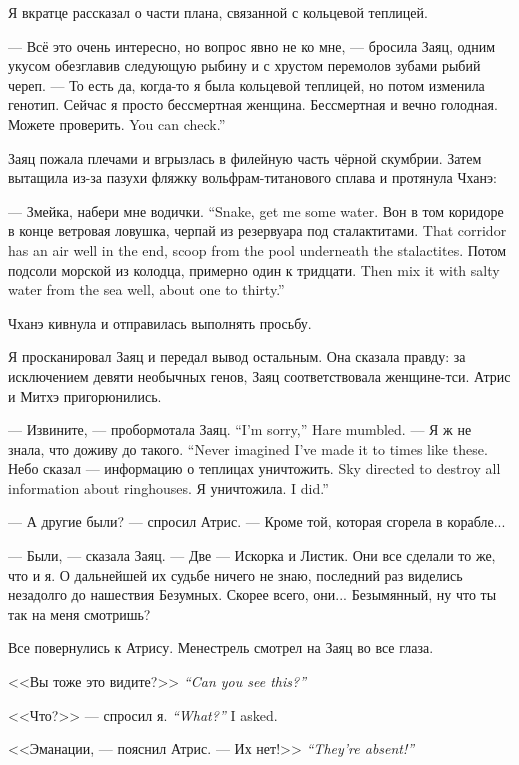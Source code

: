 Я вкратце рассказал о части плана, связанной с кольцевой теплицей.

--- Всё это очень интересно, но вопрос явно не ко мне, --- бросила Заяц, одним укусом обезглавив следующую рыбину и с хрустом перемолов зубами рыбий череп.
--- То есть да, когда-то я была кольцевой теплицей, но потом изменила генотип.
Сейчас я просто бессмертная женщина.
Бессмертная и вечно голодная.
{Можете проверить.}
{You can check.''}

Заяц пожала плечами и вгрызлась в филейную часть чёрной скумбрии.
Затем вытащила из-за пазухи фляжку вольфрам-титанового сплава и протянула Чханэ:

{--- Змейка, набери мне водички.}
{``Snake, get me some water.}
{Вон в том коридоре в конце ветровая ловушка, черпай из резервуара под сталактитами.}
{That corridor has an air well in the end, scoop from the pool underneath the stalactites.}
{Потом подсоли морской из колодца, примерно один к тридцати.}
{Then mix it with salty water from the sea well, about one to thirty.''}

Чханэ кивнула и отправилась выполнять просьбу.

Я просканировал Заяц и передал вывод остальным.
Она сказала правду: за исключением девяти необычных генов, Заяц соответствовала женщине-тси.
Атрис и Митхэ пригорюнились.

{--- Извините, --- пробормотала Заяц.}
{``I'm sorry,'' Hare mumbled.}
{--- Я ж не знала, что доживу до такого.}
{``Never imagined I've made it to times like these.}
{Небо сказал --- информацию о теплицах уничтожить.}
{Sky directed to destroy all information about ringhouses.}
{Я уничтожила.}
{I did.''}

--- А другие были? --- спросил Атрис.
--- Кроме той, которая сгорела в корабле...

--- Были, --- сказала Заяц.
--- Две --- Искорка и Листик.
Они все сделали то же, что и я.
О дальнейшей их судьбе ничего не знаю, последний раз виделись незадолго до нашествия Безумных.
Скорее всего, они...
Безымянный, ну что ты так на меня смотришь?

Все повернулись к Атрису.
Менестрель смотрел на Заяц во все глаза.

{<<Вы тоже это видите?>>}
{\textit{``Can you see this?''}}

{<<Что?>> --- спросил я.}
{\textit{``What?''} I asked.}

<<Эманации, --- пояснил Атрис.
{--- Их нет!>>}
{\textit{``They're absent!''}}

